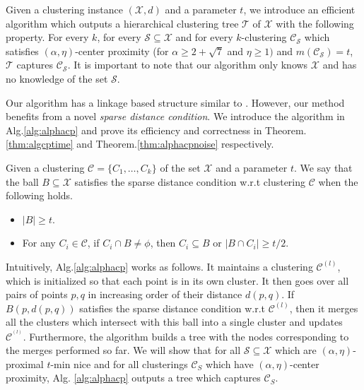 \documentclass[orivec]{llncs}
\newcommand{\mc}{\mathcal}
\begin{document}
Given a clustering instance $(\mc X, d)$ and a parameter $t$, we introduce an efficient algorithm which outputs a hierarchical clustering tree $\mc T$ of $\mc X$ with the following property. For every $k$, for every $\mc S \subseteq \mc X$ and for every $k$-clustering $\mc C_{\mc S}$ which satisfies $(\alpha, \eta)$-center proximity (for $\alpha \ge 2 + \sqrt{7}$ and $ \eta \ge 1)$ and $m(\mc C_{\mc S}) = t$, $\mc T$ captures $\mc C_{\mc S}$. It is important to note that our algorithm only knows $\mc X$ and has no knowledge of the set $\mc S$.

Our algorithm has a linkage based structure similar to \cite{balcan2012clustering}. However, our method benefits from a novel {\it sparse distance condition}. We introduce the algorithm in Alg.\ref{alg:alphacp} and prove its efficiency and correctness in Theorem. \ref{thm:algcptime} and Theorem.\ref{thm:alphacpnoise} respectively. 

\begin{definition}
	 Given a clustering $\mc C = \{C_1,\ldots,C_k\}$ of the set $\mc X$ and a parameter $t$. We say that the ball $B \subseteq \mc X$ satisfies the sparse distance condition w.r.t clustering $\mc C$ when the following holds.
\begin{itemize}[noitemsep,nolistsep,leftmargin=*]
\item $|B| \ge t$.
\item For any $C_i \in \mc C$, if $C_i \cap B \neq \phi$, then $C_i \subseteq B$ or $|B \cap C_i| \ge t/2$.
\end{itemize}
\end{definition}

Intuitively, Alg.\ref{alg:alphacp} works as follows. It maintains a clustering $\mc C^{(l)}$, which is initialized so that each point is in its own cluster. It then goes over all pairs of points $p, q$ in increasing order of their distance $d(p, q)$. If $B(p, d(p,q))$ satisfies the sparse distance condition w.r.t $\mc C^{(l)}$, then it merges all the clusters which intersect with this ball into a single cluster and updates $\mc C^{^(l)}$. Furthermore, the algorithm builds a tree with the nodes corresponding to the merges performed so far. We will show that for all $\mc S \subseteq \mc X$ which are $(\alpha, \eta)$-proximal $t$-min nice and for all clusterings $\mc C_S$ which have $(\alpha, \eta)$-center proximity, Alg. \ref{alg:alphacp} outputs a tree which captures $\mc C_S$.
\end{document}
